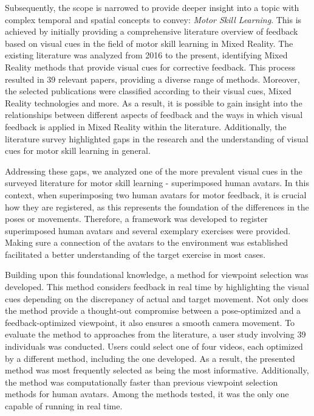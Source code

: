Subsequently, the scope is narrowed to provide deeper insight into a topic with complex temporal and spatial concepts to convey: \emph{Motor Skill Learning}.
This is achieved by initially providing a comprehensive literature overview of feedback based on visual cues in the field of motor skill learning in Mixed Reality.
The existing literature was analyzed from 2016 to the present, identifying Mixed Reality methods that provide visual cues for corrective feedback.
This process resulted in 39 relevant papers, providing a diverse range of methods.
Moreover, the selected publications were classified according to their visual cues, Mixed Reality technologies and more.
As a result, it is possible to gain insight into the relationships between different aspects of feedback and the ways in which visual feedback is applied in Mixed Reality within the literature.
Additionally, the literature survey highlighted gaps in the research and the understanding of visual cues for motor skill learning in general.

Addressing these gaps, we analyzed one of the more prevalent visual cues in the surveyed literature for motor skill learning - superimposed human avatars.
In this context, when superimposing two human avatars for motor feedback, it is crucial how they are registered, as this represents the foundation of the differences in the poses or movements.
Therefore, a framework was developed to register superimposed human avatars and several exemplary exercises were provided.
Making sure a connection of the avatars to the environment was established facilitated a better understanding of the target exercise in most cases.

Building upon this foundational knowledge, a method for viewpoint selection was developed.
This method considers feedback in real time by highlighting the visual cues depending on the discrepancy of actual and target movement.
Not only does the method provide a thought-out compromise between a pose-optimized and a feedback-optimized viewpoint, it also ensures a smooth camera movement.
To evaluate the method to approaches from the literature, a user study involving 39 individuals was conducted.
Users could select one of four videos, each optimized by a different method, including the one developed.
As a result, the presented method was most frequently selected as being the most informative.
Additionally, the method was computationally faster than previous viewpoint selection methods for human avatars.
Among the methods tested, it was the only one capable of running in real time.

